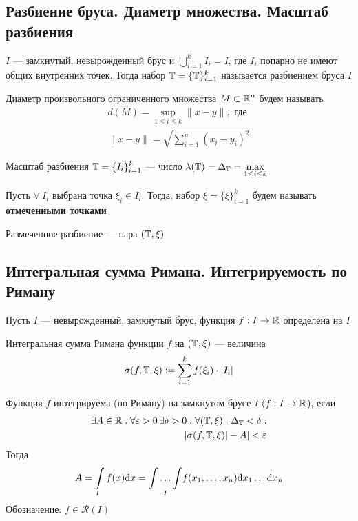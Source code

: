 \documentclass[a4paper, 10pt]{article}
\begin{document}
\subsection{Разбиение бруса. Диаметр множества. Масштаб разбиения}
 \label{1.3} $I$ — замкнутый, невырожденный брус и $\displaystyle\bigcup_{i=1}^kI_i = I$, где $I_i$ попарно не имеют общих внутренних точек. Тогда набор $\operatorname{\mathbb{T}} = \{\operatorname{\mathbb{T}}\}_{i=1}^k$ называется разбиением бруса $I$

 \label{1.4} Диаметр произвольного ограниченного множества $M\subset\operatorname{\mathbb{R}}^n$ будем называть 
\begin{equation*}
\begin{aligned}
    d(M) = \displaystyle\sup_{1\leqslant i\leqslant k}\|x-y\|,\text{ где}\\
    \|x-y\|=\sqrt{\sum_{i=1}^{n}\left(x_i-y_i\right)^2}
\end{aligned}
\end{equation*}

 \label{1.5} Масштаб разбиения $\operatorname{\mathbb{T}}=\{I_i\}_{i=1}^k$ — число $\lambda(\operatorname{\mathbb{T}}) = \Delta_{\operatorname{\mathbb{T}}} = \displaystyle\max_{1\le i\le k}$

 \label{1.6} Пусть $\forall\ I_i$ выбрана точка $\xi_i\in I_i$. Тогда, набор $\xi = \{\xi\}_{i=1}^k$ будем называть \textbf{отмеченными точками}

 \label{1.7} Размеченное разбиение — пара $(\operatorname{\mathbb{T}}, \xi)$

\subsection{Интегральная сумма Римана. Интегрируемость по Риману}
Пусть $I$ — невырожденный, замкнутый брус, функция $f: I\rightarrow \operatorname{\mathbb{R}}$ определена на $I$

 \label{1.8} Интегральная сумма Римана функции $f$ на $(\operatorname{\mathbb{T}}, \xi)$ — величина
$$\sigma(f, \T, \xi) := \sum_{i=1}^kf(\xi_i)\cdot|I_i|$$

 \label{1.9} Функция $f$ интегрируема (по Риману) на замкнутом брусе $I$ ($f:I\rightarrow\operatorname{\mathbb{R}}$), если 
\begin{equation*}
\begin{aligned}
    \exists A\in\operatorname{\mathbb{R}}: \forall \varepsilon > 0\, \exists \delta > 0: \forall(\operatorname{\mathbb{T}}, \xi): \Delta_{\operatorname{\mathbb{T}}} < \delta:\\
    |\sigma(f, \operatorname{\mathbb{T}}, \xi)| - A| < \varepsilon
\end{aligned}
\end{equation*}
Тогда 
$$A = \int\limits_If(x)\text{d}x = \underset{I}{\int\ldots\int}f(x_1, \ldots, x_n)\text{d}x_1\ldots \text{d}x_n$$
Обозначение: $f\in\mathcal{R}(I)$
\end{document}
